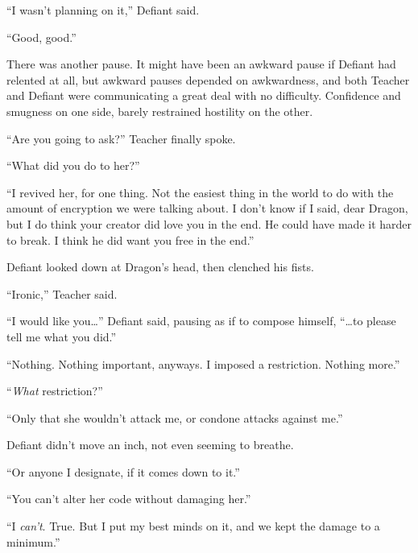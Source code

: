 ``I wasn't planning on it,'' Defiant said.



``Good, good.''



There was another pause.  It might have been an awkward pause if Defiant had relented at all, but awkward pauses depended on awkwardness, and both Teacher and Defiant were communicating a great deal with no difficulty.  Confidence and smugness on one side, barely restrained hostility on the other.



``Are you going to ask?'' Teacher finally spoke.



``What did you do to her?''



``I revived her, for one thing.  Not the easiest thing in the world to do with the amount of encryption we were talking about.  I don't know if I said, dear Dragon, but I do think your creator did love you in the end.  He could have made it harder to break.  I think he did want you free in the end.''



Defiant looked down at Dragon's head, then clenched his fists.



``Ironic,'' Teacher said.



``I would like you\ldots'' Defiant said, pausing as if to compose himself, ``\ldots{}to please tell me what you did.''



``Nothing.  Nothing important, anyways.  I imposed a restriction.  Nothing more.''



``\emph{What} restriction?''



``Only that she wouldn't attack me, or condone attacks against me.''



Defiant didn't move an inch, not even seeming to breathe.



``Or anyone I designate, if it comes down to it.''



``You can't alter her code without damaging her.''



``I \emph{can't}.  True.  But I put my best minds on it, and we kept the damage to a minimum.''



